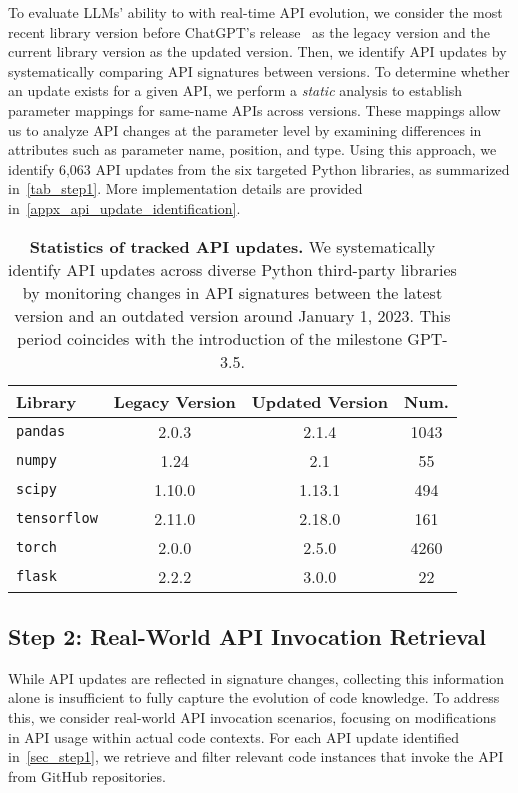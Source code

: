 To evaluate LLMs' ability to  with real-time API evolution, we consider the most recent library version before ChatGPT's release~\cite{openai2023chatgpt} as the legacy version and the current library version as the updated version. Then, we identify API updates by systematically comparing API signatures between versions. 
To determine whether an update exists for a given API, we perform a \textit{static} analysis to establish parameter mappings for same-name APIs across versions. These mappings allow us to analyze API changes at the parameter level by examining differences in attributes such as parameter name, position, and type. Using this approach, we identify 6,063 API updates from the six targeted Python libraries, as summarized in~\autoref{tab_step1}. More implementation details are provided in~\cref{appx_api_update_identification}.

\begin{table}[!t]
\small
\setlength{\tabcolsep}{4pt} 
\caption{\textbf{Statistics of tracked API updates.} We systematically identify API updates across diverse Python third-party libraries by monitoring changes in API signatures between the latest version and an outdated version around January 1, 2023. This period coincides with the introduction of the milestone GPT-3.5.}
\vspace{0.5em}
\centering
\begin{tabular}{l|ccc}
    \toprule
    \textbf{Library} & \textbf{Legacy Version} & \textbf{Updated Version} & \textbf{Num.} \\
    \midrule
    \texttt{pandas} & 2.0.3 & 2.1.4 & 1043 \\
    \texttt{numpy} & 1.24 & 2.1 & 55 \\
    \texttt{scipy} & 1.10.0 & 1.13.1 & 494 \\
    \texttt{tensorflow} & 2.11.0 & 2.18.0 & 161 \\
    \texttt{torch} & 2.0.0 & 2.5.0 & 4260 \\
    \texttt{flask} & 2.2.2 & 3.0.0 & 22 \\
    \bottomrule
\end{tabular}
\label{tab_step1}
\vspace{-0.5em}
\end{table}

\subsection{Step 2: Real-World API Invocation Retrieval}
\label{sec_step2}
While API updates are reflected in signature changes, collecting this information alone is insufficient to fully capture the evolution of code knowledge. To address this, we consider real-world API invocation scenarios, focusing on modifications in API usage within actual code contexts. For each API update identified in~\autoref{sec_step1}, we retrieve and filter relevant code instances that invoke the API from GitHub repositories.

